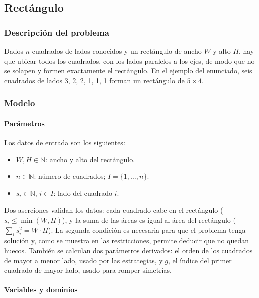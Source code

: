 \subsection{Rectángulo}

\subsubsection{Descripción del problema}

Dados $n$ cuadrados de lados conocidos y un rectángulo de ancho $W$ y alto $H$, hay que ubicar todos los cuadrados, con los lados paralelos a los ejes, de modo que no se solapen y formen exactamente el rectángulo. En el ejemplo del enunciado, seis cuadrados de lados 3, 2, 2, 1, 1, 1 forman un rectángulo de $5 \times 4$.

\subsubsection{Modelo}

\paragraph{Parámetros}

Los datos de entrada son los siguientes:

\begin{itemize}
    \item $W, H \in \mathbb{N}$: ancho y alto del rectángulo.
    \item $n \in \mathbb{N}$: número de cuadrados; $I = \{1, \dots, n\}$.
    \item $s_i \in \mathbb{N}$, $i \in I$: lado del cuadrado $i$.
\end{itemize}

Dos aserciones validan los datos: cada cuadrado cabe en el rectángulo ($s_i \le \min(W, H)$), y la suma de las áreas es igual al área del rectángulo ($\sum_i s_i^2 = W \cdot H$). La segunda condición es necesaria para que el problema tenga solución y, como se muestra en las restricciones, permite deducir que no quedan huecos. También se calculan dos parámetros derivados: el orden de los cuadrados de mayor a menor lado, usado por las estrategias, y $g$, el índice del primer cuadrado de mayor lado, usado para romper simetrías.

\paragraph{Variables y dominios}


